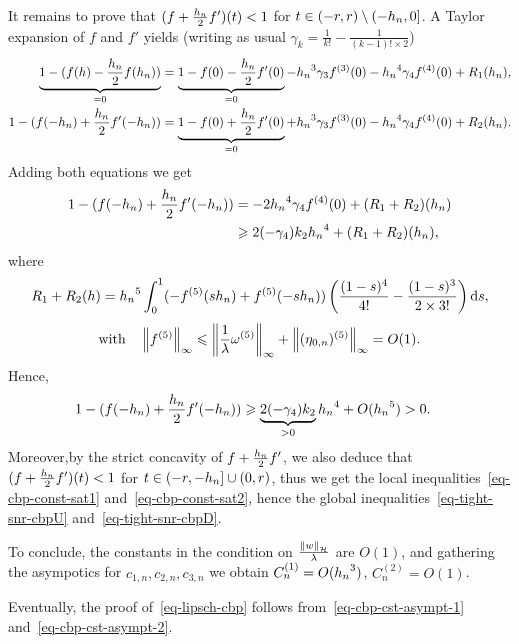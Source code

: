 It remains to prove that  $(f+\frac{{h_n}}{2} f')(t)<1$ for $t\in (-r,r)\setminus (-{h_n},0]$. A Taylor expansion of $f$ and $f'$ yields (writing as usual $\gamma_k=\frac{1}{k!}- \frac{1}{(k-1)!\times 2}$)
\begin{align*}
  \underbrace{1-(f(h)- \frac{{h_n}}{2}f({h_n}))}_{=0} &= \underbrace{1- f(0)- \frac{{h_n}}{2}f'(0)}_{=0} -{h_n}^3\gamma_3 f^{(3)}(0) - {h_n}^4\gamma_4f^{(4)}(0) +R_1({h_n}),\\
  1-(f(-{h_n})+\frac{{h_n}}{2} f'(-{h_n}))&=  \underbrace{1- f(0)+ \frac{{h_n}}{2}f'(0)}_{=0} +{h_n}^3\gamma_3 f^{(3)}(0) - {h_n}^4\gamma_4f^{(4)}(0) + R_2({h_n}).
\end{align*}
Adding both equations we get 
\begin{align}
  1-(f(-\stepsizen)+\frac{\stepsizen}{2} f'(-\stepsizen))&= -2\stepsizen^4\gamma_4f^{(4)}(0)+ (R_1+R_2)(\stepsizen)\\ %
  \label{eq-minoration-dl} &\geq 2(-\gamma_4) k_2\stepsizen^4 + (R_1+R_2)(\stepsizen), 
\end{align}
where
\begin{align}R_1+R_2(h) = {h_n}^5\int_0^1 (-f^{(5)}(s{h_n})+f^{(5)}(-s{h_n}))\left(\frac{(1-s)^4}{4!} -\frac{(1-s)^3}{2\times 3!}\right) \mathrm{d} s,\label{eq-rest-integral}
\end{align}
\begin{align}  
	\mbox{with} \quad \left\lVert f^{(5)} \right\rVert_{\infty} \leqslant \left\lVert \frac{1}{\lambda}\omega^{(5)} \right\rVert_\infty+\left\lVert (\eta_{0,n})^{(5)} \right\rVert_\infty=O(1).
\end{align}
Hence, 
\begin{align}
  1-(f(-{h_n})+\frac{{h_n}}{2} f'(-{h_n}))&\geqslant \underbrace{2(-\gamma_4) k_2}_{>0}{h_n}^4 + O({h_n}^5)>0.
\end{align}
Moreover,by the strict concavity of $f+\frac{{h_n}}{2} f'$, we also deduce that $(f+\frac{{h_n}}{2} f')(t)<1$ for $t\in (-r,-{h_n}]\cup (0,r)$, thus we get the local inequalities~\eqref{eq-cbp-const-sat1} and~\eqref{eq-cbp-const-sat2}, hence the global inequalities~\eqref{eq-tight-snr-cbpU} and~\eqref{eq-tight-snr-cbpD}.

To conclude, the constants in the condition on $\frac{\left\lVert w \right\rVert_{\mathcal{H}}}{\lambda}$ are $O(1)$, and gathering the asympotics for $c_{1,n},c_{2,n},c_{3,n}$ we obtain $C^{(1)}_{n}=O({h_n}^3)$, $C^{(2)}_n= O(1)$.

Eventually, the proof of~\eqref{eq-lipsch-cbp} follows from~\eqref{eq-cbp-cst-asympt-1} and~\eqref{eq-cbp-cst-asympt-2}. 

